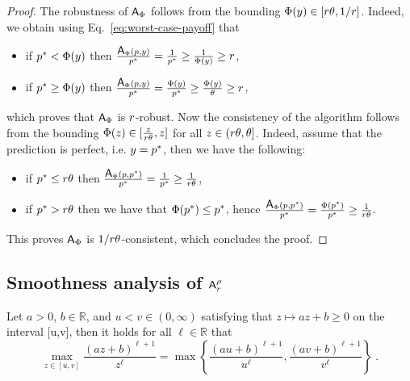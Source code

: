 \begin{proof}
The robustness of $\mbox{\textup{\textsf{A}}}_\Phi$ follows from the bounding $\Phi(y) \in [r\theta, 1/r]$. Indeed, we obtain using Eq.~\eqref{eq:worst-case-payoff} that
\begin{itemize}
    \item if $p^* < \Phi(y)$ then 
    $\frac{\mbox{\textup{\textsf{A}}}_\Phi(p, y)}{p^*} = \frac{1}{p^*} \geq \frac{1}{\Phi(y)} \geq r$,
    \item if $p^* \geq \Phi(y)$ then 
    $\frac{\mbox{\textup{\textsf{A}}}_\Phi(p, y)}{p^*} = \frac{\Phi(y)}{p^*} \geq \frac{\Phi(y)}{\theta} \geq r$\;,
\end{itemize}
which proves that $\mbox{\textup{\textsf{A}}}_\Phi$ is $r$-robust. Now the consistency of the algorithm follows from the bounding $\Phi(z) \in [\frac{z}{r \theta}, z]$ for all $z \in (r \theta, \theta]$. Indeed, assume that the prediction is perfect, i.e. $y = p^*$, then we have the following:
\begin{itemize}
    \item if $p^* \leq r \theta$ then $\frac{\mbox{\textup{\textsf{A}}}_\Phi(p, p^*)}{p^*} = \frac{1}{p^*} \geq \frac{1}{r \theta}$,
    \item if $p^* > r \theta$ then we have that $\Phi(p^*) \leq p^*$, hence $\frac{\mbox{\textup{\textsf{A}}}_\Phi(p, p^*)}{p^*} = \frac{\Phi(p^*)}{p^*} \geq \frac{1}{r \theta}$.
\end{itemize}
This proves $\mbox{\textup{\textsf{A}}}_\Phi$ is $1/r \theta$-consistent, which concludes the proof.
\end{proof}


\subsection{Smoothness analysis of \texorpdfstring{$\mbox{\textup{\textsf{A}}}^\rho_r$}{A}}


\begin{lemma}\label{lem:max(az+b)/z}
Let $a >0$, $b \in \mathbb{R}$, and $u<v \in (0,\infty)$ satisfying that $z \mapsto az+b \geq 0$ on the interval [u,v], then it holds for all $\ell \in \mathbb{R}$ that
\[
\max_{z \in [u,v]} \frac{(az+b)^{\ell+1}}{z^\ell} 
= \max \left\{ \frac{(au+b)^{\ell+1}}{u^\ell}, \frac{(av+b)^{\ell+1}}{v^\ell} \right\}\;.
\]
\end{lemma}

